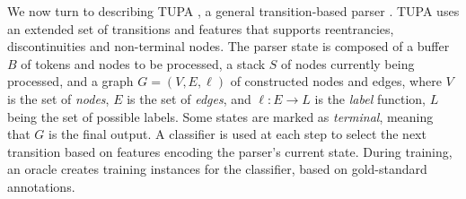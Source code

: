 \documentclass[11pt,a4paper]{article}
\begin{document}
We now turn to describing TUPA \cite{hershcovich2017a,hershcovich2018multitask},
a general transition-based parser \cite{Nivre03anefficient}.
TUPA uses an extended set of transitions and features that supports
reentrancies, discontinuities and non-terminal nodes.
The parser state is composed of a buffer $B$ of tokens and nodes to be processed,
a stack $S$ of nodes currently being processed,
and a graph $G=(V,E,\ell)$ of constructed nodes and edges,
where $V$ is the set of \emph{nodes}, $E$ is the set of \emph{edges},
and $\ell : E \to L$ is the \emph{label} function, $L$ being the set of possible labels.
Some states are marked as \textit{terminal}, meaning that $G$ is the final output.
A classifier is used at each step to select the next transition based on features
encoding the parser's current state.
During training, an oracle creates training instances for the classifier,
based on gold-standard annotations.
\end{document}
